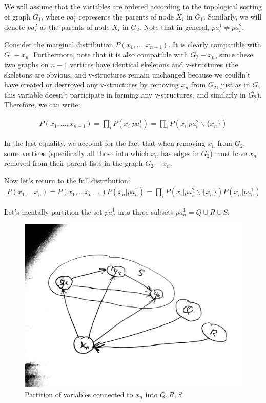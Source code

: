 \documentclass[fleqn]{article}
\numberwithin{equation}{section}
\numberwithin{theorem}{section}
\numberwithin{figure}{section}
\numberwithin{lemma}{section}
\numberwithin{corollary}{section}
\begin{document}
We will assume that the variables are ordered according to the topological sorting of graph \( G_1 \), where \( pa^1_i \) represents the parents of node \( X_i \) in \( G_1 \). Similarly, we will denote \( pa^2_i \) as the parents of node \( X_i \) in \( G_2 \). Note that in general, \( pa^1_i \neq pa^2_i \).

Consider the marginal distribution \( P(x_1,...,x_{n-1}) \). It is clearly compatible with \( G_1-x_n \). Furthermore, note that it is also compatible with \( G_2-x_n \), since these two graphs on \( n-1 \) vertices have identical skeletons and v-structures (the skeletons are obvious, and v-structures remain unchanged because we couldn't have created or destroyed any v-structures by removing \( x_n \) from \( G_2 \), just as in \( G_1 \) this variable doesn't participate in forming any v-structures, and similarly in \( G_2 \)). Therefore, we can write:

\begin{align}
	P(x_1,...,x_{n-1}) = \prod\limits_{i}P(x_i|pa^1_{i}) = \prod\limits_{i}P(x_i|pa^2_{i} \backslash \{x_n\}) 
\end{align}

In the last equality, we account for the fact that when removing \( x_n \) from \( G_2 \), some vertices (specifically all those into which \( x_n \) has edges in \( G_2 \)) must have \( x_n \) removed from their parent lists in the graph \( G_2-x_n \).

Now let's return to the full distribution:
\begin{align}
	P(x_1,...x_{n}) = P(x_1,...x_{n-1})P(x_n|pa^1_{n}) = \prod\limits_{i}P(x_i|pa^2_{i} \backslash \{x_n\}) P(x_n|pa^1_{n})
\end{align}

Let's mentally partition the set \( pa^1_n \) into three subsets \( pa^1_n = Q \cup R \cup S \):

\begin{figure}[h]
	\begin{center}
		\includegraphics[scale=0.05]{imgs/img11.png}
	\end{center}
	\caption{Partition of variables connected to \( x_n \) into \( Q, R, S \)}
	\label{fig:equiv2}
\end{figure}
\end{document}
